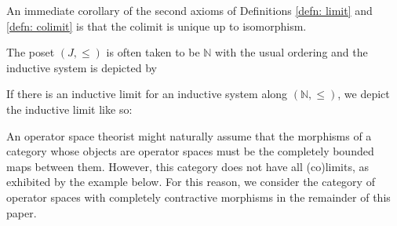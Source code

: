\documentclass[12pt]{article}
\theoremstyle{definition}
\newenvironment{remark}
  {\pushQED{\qed}\renewcommand{\qedsymbol}{\textcircled{\tiny R}}\remarkx}
  {\popQED\endremarkx}
\newenvironment{example}
  {\pushQED{\qed}\renewcommand{\qedsymbol}{\textcircled{\tiny E}}\examplex}
  {\popQED\endexamplex}
\newcommand{\N}{\mathbb N}
\newcommand{\<}{\langle}
\renewcommand{\>}{\rangle}
\begin{document}
\begin{remark}
    An immediate corollary of the second axioms of Definitions \ref{defn: limit} and \ref{defn: colimit} is that the colimit is unique up to isomorphism.
\end{remark}

\begin{example}
    The poset $(J,\leq)$ is often taken to be $\N$ with the usual ordering and the inductive system is depicted by
    \begin{center}
    \end{center}
\end{example}

\begin{example}
    If there is an inductive limit for an inductive system along $(\N, \leq)$, we depict the inductive limit like so:
    \begin{center}
    \end{center}
\end{example}

An operator space theorist might naturally assume that the morphisms of a category whose objects are operator spaces must be the completely bounded maps between them. However, this category does not have all (co)limits, as exhibited by the example below. For this reason, we consider the category of operator spaces with completely contractive morphisms in the remainder of this paper.
\end{document}
